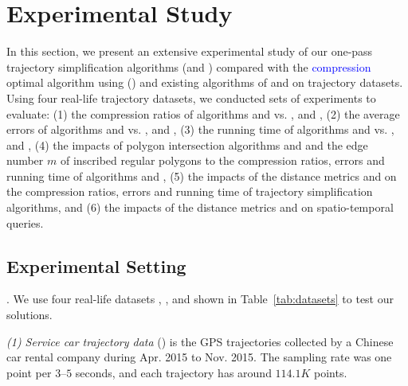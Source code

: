 \section{Experimental Study} %
\label{sec-exp}


In this section, we present an extensive experimental study of our one-pass trajectory simplification algorithms (\cist and \cista) compared with the \textcolor{blue}{compression} optimal algorithm using \sed (\osed) and existing algorithms of \dps and \squishe on trajectory datasets.
%
Using four real-life trajectory datasets, we conducted sets of experiments to evaluate:
(1) the compression ratios of algorithms \cist and \cista vs. \dps, \squishe and \osed,
(2) the average errors of algorithms \cist and \cista vs. \dps, \squishe and \osed,
(3) the running time of algorithms \cist and \cista vs. \dps, \squishe and \osed,
(4) the impacts of polygon intersection algorithms \rpia and \cpia and the edge number $m$ of inscribed regular polygons to the compression ratios, errors and running time of algorithms \cist and \cista,
(5) the impacts of the distance metrics \ped and \sed on the compression ratios, errors and running time of trajectory simplification algorithms, and
{(6) the impacts of the distance metrics \ped and \sed on spatio-temporal queries.}


\subsection{Experimental Setting}

.
We use four real-life datasets \sercar, \geolife, \mopsi and \pricar shown in Table~\ref{tab:datasets} to test our solutions.


\vspace{0.5ex}
\ni \emph{(1) Service car trajectory data} (\sercar) is the GPS trajectories collected by a Chinese car rental company during Apr. 2015 to Nov. 2015. The sampling rate was one point per $3$--$5$ seconds, and
each trajectory has around $114.1K$ points.

